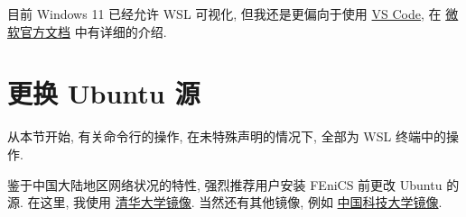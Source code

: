 \documentclass[fontset=founder]{ctexrep}
\begin{document}
目前 Windows 11 已经允许 WSL 可视化,
但我还是更偏向于使用
\href{https://code.visualstudio.com/}{VS Code},
在%
\href{https://learn.microsoft.com/zh-cn/windows/wsl/tutorials/wsl-vscode}{微软官方文档}%
中有详细的介绍.

\section{更换 Ubuntu 源}\label{sec:source}

从本节开始,
有关命令行的操作,
在未特殊声明的情况下,
全部为 WSL 终端中的操作.

鉴于中国大陆地区网络状况的特性,
强烈推荐用户安装 FEniCS 前更改 Ubuntu 的源.
在这里,
我使用%
\href{https://mirrors.tuna.tsinghua.edu.cn/help/ubuntu/}{清华大学镜像}.
当然还有其他镜像,
例如%
\href{https://mirrors.ustc.edu.cn/help/ubuntu.html}{中国科技大学镜像}.
\end{document}
